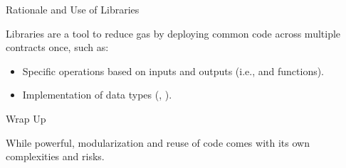 \documentclass[handout]{beamer}
\begin{document}
\begin{frame}{Rationale and Use of Libraries}

Libraries are a tool to reduce gas by deploying common code across multiple contracts once, such as:
\vspace{0.5em}
\begin{itemize}
	\item	Specific operations based on inputs and outputs (i.e.,  and  functions).
	\item	Implementation of data types (, ).
\end{itemize}
\vspace{1em}



\end{frame}


\begin{frame}{Wrap Up}
	
While powerful, modularization and reuse of code comes with its own \color{focus} complexities and risks\color{black}.

\vspace{0.5em}

\vspace{0.5em}

\end{frame}
\end{document}
